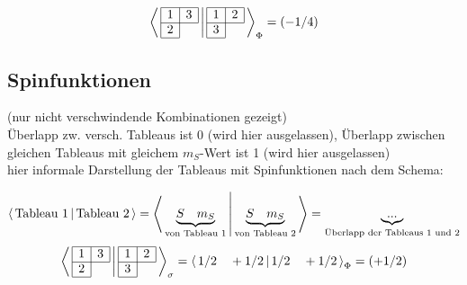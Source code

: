 \documentclass[fleqn]{article}%
\newcommand{\checkpagebreak}{\needspace{.25\textheight}}%
\begin{document}
%
\begin{dmath*}\bra{\,\begin{array}{|c|c|} \hline 1 & 3\\ \cline{1-2} 2\\ \cline{1-1} \end{array} \,} \ket{\,\begin{array}{|c|c|} \hline 1 & 2\\ \cline{1-2} 3\\ \cline{1-1} \end{array} \,}_{\Phi} = \left( - 1/4\right) \end{dmath*}%
\vspace{0.25cm}%
\checkpagebreak%
\subsection{Spinfunktionen}%
\label{subsec:Spinfunktionen}%
(nur nicht verschwindende Kombinationen gezeigt)\\ Überlapp zw. versch. Tableaus ist 0 (wird hier ausgelassen), Überlapp zwischen gleichen Tableaus mit gleichem $m_S$-Wert ist 1 (wird hier ausgelassen)\\hier informale Darstellung der Tableaus mit Spinfunktionen nach dem Schema: 

%
\begin{dmath*}\bra{\,\text{Tableau 1}\,}\ket{\,\text{Tableau 2}\,} = \bra{\, \underbrace{S \quad m_S}_{\text{von Tableau 1}} \,} \ket{\, \underbrace{S \quad m_S}_{\text{von Tableau 2}} \,} = \underbrace{...}_{\text{Überlapp der Tableaus 1 und 2}}\end{dmath*}%
\vspace{0.25cm}%
\vspace{0.25cm}%
\vspace{0.25cm}%
\begin{dmath*}\bra{\,\begin{array}{|c|c|} \hline 1 & 3\\ \cline{1-2} 2\\ \cline{1-1} \end{array} \,} \ket{\,\begin{array}{|c|c|} \hline 1 & 2\\ \cline{1-2} 3\\ \cline{1-1} \end{array} \,}_{\sigma }=\bra{\, 1/2\quad +1/2 \,} \ket{\, 1/2\quad +1/2 \,}_{\Phi} = \left( + 1/2\right) \end{dmath*}%
\vspace{0.25cm}%
\newpage%
\end{document}
